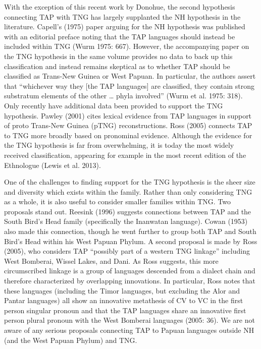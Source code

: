 With the exception of this recent work by Donohue, the second hypothesis connecting TAP with TNG has largely supplanted the NH hypothesis in the literature. Capell{\textquoteright}s (1975) paper arguing for the NH hypothesis was published with an editorial preface noting that the TAP languages should instead be included within TNG (Wurm 1975: 667). However, the accompanying paper on the TNG hypothesis in the same volume provides no data to back up this classification and instead remains skeptical as to whether TAP should be classified as Trans-New Guinea or West Papuan. In particular, the authors assert that {\textquotedblleft}whichever way they [the TAP languages] are classified, they contain strong substratum elements of the other {\dots} phyla involved{\textquotedblright} (Wurm et al. 1975: 318). Only recently have additional data been provided to support the TNG hypothesis. Pawley (2001) cites lexical evidence from TAP languages in support of proto Trans-New Guinea (pTNG) reconstructions. Ross (2005) 
connects TAP to TNG more broadly based on pronominal evidence. Although the evidence for the TNG hypothesis is far from overwhelming, it is today the most widely received classification, appearing for example in the most recent edition of the Ethnologue (Lewis et al. 2013).

One of the challenges to finding support for the TNG hypothesis is the sheer size and diversity which exists within the family. Rather than only considering TNG as a whole, it is also useful to consider smaller families within TNG. Two proposals stand out. Reesink (1996) suggests connections between TAP and the South Bird{\textquoteright}s Head family (specifically the Inanwatan language). Cowan (1953) also made this connection, though he went further to group both TAP and South Bird{\textquoteright}s Head within his West Papuan Phylum. A second proposal is made by Ross (2005), who considers TAP {\textquotedblleft}possibly part of a western TNG linkage{\textquotedblright} including West Bomberai, Wissel Lakes, and Dani. As Ross suggests, this more circumscribed linkage is a group of languages descended from a dialect chain and therefore characterized by overlapping innovations. In particular, Ross notes that these languages (including the Timor languages, but excluding the Alor and Pantar languages) all show 
an innovative metathesis of CV to VC in the first person singular pronoun and that the TAP languages share an innovative first person plural pronoun with the West Bomberai languages (2005: 36). We are not aware of any serious proposals connecting TAP to Papuan languages outside NH (and the West Papuan Phylum) and TNG.

